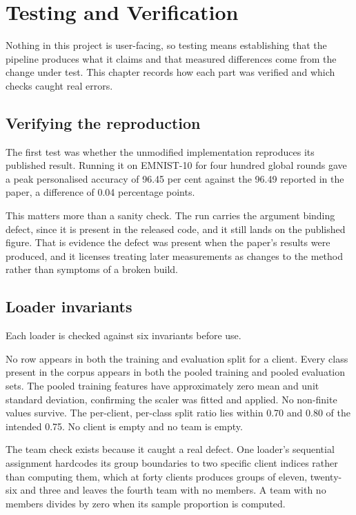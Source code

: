 \chapter{Testing and Verification}
\label{chap:testing}

Nothing in this project is user-facing, so testing means establishing that the
pipeline produces what it claims and that measured differences come from the
change under test. This chapter records how each part was verified and which
checks caught real errors.

\section{Verifying the reproduction}
\label{sec:verify-repro}

The first test was whether the unmodified implementation reproduces its
published result. Running it on EMNIST-10 for four hundred global rounds gave a
peak personalised accuracy of 96.45 per cent against the 96.49 reported in the
paper, a difference of 0.04 percentage points.

This matters more than a sanity check. The run carries the argument binding
defect, since it is present in the released code, and it still lands on the
published figure. That is evidence the defect was present when the paper's
results were produced, and it licenses treating later measurements as changes
to the method rather than symptoms of a broken build.

\section{Loader invariants}
\label{sec:loader-invariants}

Each loader is checked against six invariants before use.

No row appears in both the training and evaluation split for a client. Every
class present in the corpus appears in both the pooled training and pooled
evaluation sets. The pooled training features have approximately zero mean and
unit standard deviation, confirming the scaler was fitted and applied. No
non-finite values survive. The per-client, per-class split ratio lies within
0.70 and 0.80 of the intended 0.75. No client is empty and no team is empty.

The team check exists because it caught a real defect. One loader's sequential
assignment hardcodes its group boundaries to two specific client indices rather
than computing them, which at forty clients produces groups of eleven, twenty-six
and three and leaves the fourth team with no members. A team with no members
divides by zero when its sample proportion is computed.

